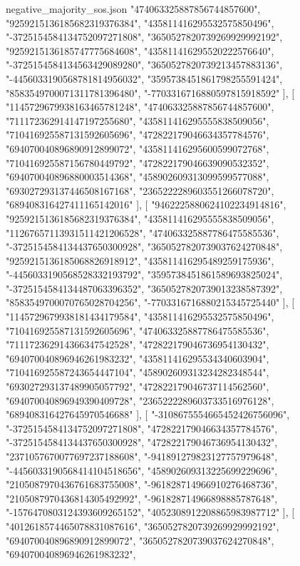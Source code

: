 \begin{filecontents*}[overwrite]{negative_majority_sos.json}
    "474063325887856744857600",
    "9259215136185682319376384",
    "435811416295532575850496",
    "-3725154584134752097271808",
    "3650527820739269929992192",
    "9259215136185747775684608",
    "435811416295520222576640",
    "-3725154584134563429089280",
    "3650527820739213457883136",
    "-4456033190568781814956032",
    "3595738451861798255591424",
    "8583549700071311781396480",
    "-7703316716880597815918592"
   ],
   [
    "1145729679938163465781248",
    "474063325887856744857600",
    "711172362914147197255680",
    "435811416295555838509056",
    "710416925587131592605696",
    "472822179046634357784576",
    "694070040896890912899072",
    "435811416295600599072768",
    "710416925587156780449792",
    "472822179046639090532352",
    "694070040896880003514368",
    "458902609313099599577088",
    "693027293137446508167168",
    "2365222289603551266078720",
    "689408316427411165142016"
   ],
   [
    "9462225880624102234914816",
    "9259215136185682319376384",
    "435811416295555838509056",
    "11267657113931511421206528",
    "474063325887786475585536",
    "-3725154584134437650300928",
    "3650527820739037624270848",
    "9259215136185068826918912",
    "435811416295489259175936",
    "-4456033190568528332193792",
    "3595738451861589693825024",
    "-3725154584134487063396352",
    "3650527820739013238587392",
    "8583549700070765028704256",
    "-7703316716880215345725440"
   ],
   [
    "1145729679938181434179584",
    "435811416295532575850496",
    "710416925587131592605696",
    "474063325887786475585536",
    "711172362914366347542528",
    "472822179046736954130432",
    "694070040896946261983232",
    "435811416295534340603904",
    "710416925587243654447104",
    "458902609313234282348544",
    "693027293137489905057792",
    "472822179046737114562560",
    "694070040896949390409728",
    "2365222289603733516976128",
    "689408316427645970546688"
   ],
   [
    "-3108675554665452426756096",
    "-3725154584134752097271808",
    "472822179046634357784576",
    "-3725154584134437650300928",
    "472822179046736954130432",
    "2371057670077697237188608",
    "-941891279823127757979648",
    "-4456033190568414104518656",
    "458902609313225699229696",
    "2105087970436761683755008",
    "-961828714966910276468736",
    "2105087970436814305492992",
    "-961828714966898885787648",
    "-1576470803124393609265152",
    "4052308912208865983987712"
   ],
   [
    "4012618574465078831087616",
    "3650527820739269929992192",
    "694070040896890912899072",
    "3650527820739037624270848",
    "694070040896946261983232",

\end{filecontents*}
